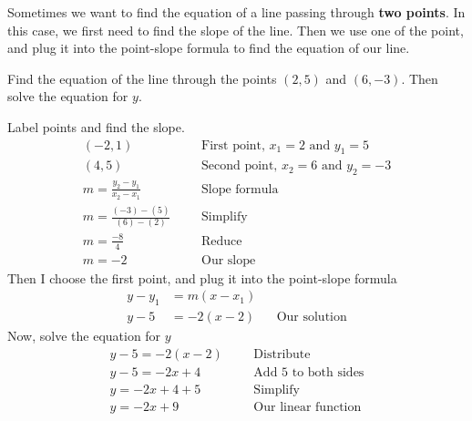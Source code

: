 \vspace{0.4cm}
\begin{nt}
 Sometimes we want to find the equation of a line passing through \textbf{two points}. In this case, we first need to find the slope of the line. Then we use one of the point, and plug it into the point-slope formula to find the equation of our line.
\end{nt}
\begin{exa}
	Find the equation of the line through the points $(2, 5)$ and 
    $(6, -3)$. Then solve the equation for $y$.
\end{exa}
\vspace{0.2 cm}
Label points and find the slope.
\begin{align*}
		(-2,1)&		&&\textrm{First point, $x_1=2$ and $y_1=5$}\\
        (4,5) &	&&\textrm{Second point, $x_2=6$ and $y_2=-3$}\\
        m = \frac{y_2-y_1}{x_2-x_1}&	&&\textrm{Slope formula}\\
        m = \frac{(-3)-(5)}{(6)-(2)}&	&&\textrm{Simplify}\\  
        m = \frac{-8}{4}&	&&\textrm{Reduce}\\
        m = -2&	&&\textrm{Our slope}
\end{align*}
Then I choose the first point, and plug it into the point-slope formula
\begin{align*}
		y-y_1 &= m(x-x_1) &&\\
        y-5 &= -2(x-2)	&&\textrm{Our solution}
\end{align*}
Now, solve the equation for $y$
\begin{align*}
        y-5 = -2(x-2)&	&&\text{Distribute}\\
        y-5 = -2x+4&    &&\text{Add 5 to both sides}\\
        y = -2x+4+5&    &&\text{Simplify}\\
        y = -2x+9&  &&\text{Our linear function}
\end{align*}

